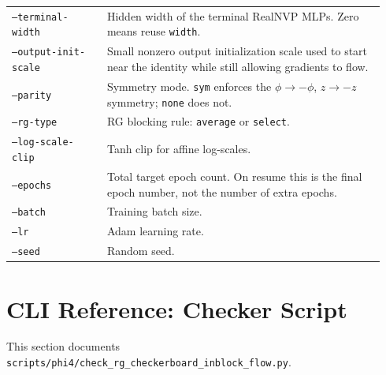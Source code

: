 \documentclass[11pt]{article}
\begin{document}
\begin{longtable}{p{0.24\linewidth}p{0.70\linewidth}}
\texttt{--terminal-width} & Hidden width of the terminal RealNVP MLPs. Zero means reuse \texttt{width}. \\
\texttt{--output-init-scale} & Small nonzero output initialization scale used to start near the identity while still allowing gradients to flow. \\
\texttt{--parity} & Symmetry mode. \texttt{sym} enforces the $\phi\to-\phi$, $z\to-z$ symmetry; \texttt{none} does not. \\
\texttt{--rg-type} & RG blocking rule: \texttt{average} or \texttt{select}. \\
\texttt{--log-scale-clip} & Tanh clip for affine log-scales. \\
\texttt{--epochs} & Total target epoch count. On resume this is the final epoch number, not the number of extra epochs. \\
\texttt{--batch} & Training batch size. \\
\texttt{--lr} & Adam learning rate. \\
\texttt{--seed} & Random seed. \\
\bottomrule
\end{longtable}

\section{CLI Reference: Checker Script}

This section documents
\texttt{scripts/phi4/check\_rg\_checkerboard\_inblock\_flow.py}.
\end{document}
